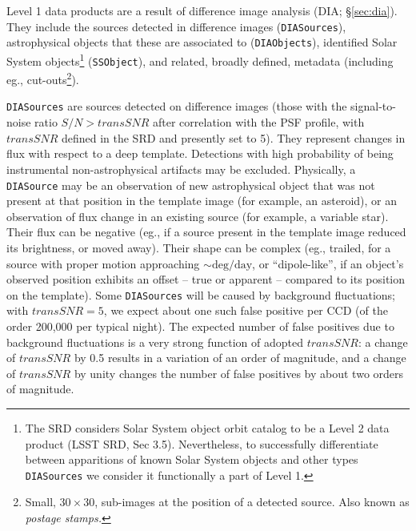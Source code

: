 \documentclass[12pt]{article}
\newcommand{\B}[1]{{\color{blue} #1}}
\newcommand{\code}[1]{\texttt{#1}}
\newcommand{\DIASource}{\code{DIASource}\xspace}
\newcommand{\DIASources}{\code{DIASources}\xspace}
\newcommand{\DIAObjects}{\code{DIAObjects}\xspace}
\newcommand{\SSObject}{\code{SSObject}\xspace}
\newcommand{\transSNR}{5\xspace}
\newcommand{\req}[1]{\marginpar{\tiny #1}}
\begin{document}
Level 1 data products are a result of difference image analysis (DIA; \S \ref{sec:dia}). They include the sources detected in difference images (\DIASources), astrophysical objects that these are associated to (\DIAObjects), identified Solar System objects\footnote{The SRD considers Solar System object orbit catalog to be a Level 2 data product (LSST SRD, Sec 3.5). Nevertheless, to successfully differentiate between apparitions of known Solar System objects and other types \DIASources we consider it functionally a part of Level 1.} (\SSObject), and related, broadly defined, metadata (including eg., cut-outs\footnote{Small, $30 \times 30$, sub-images at the position of a detected source. Also known as \emph{postage stamps.}}).

\DIASources are sources detected on difference images (those with the signal-to-noise ratio $S/N>transSNR$ after correlation with the PSF profile, with $transSNR$\req{transSNR} defined in the SRD and presently set to \transSNR). They represent changes in flux with respect to a deep template. \B{Detections with high probability of being instrumental non-astrophysical artifacts may be excluded.} Physically, a \DIASource may be an observation of new astrophysical object that was not present at that position in the template image (for example, an asteroid), or an observation of flux change in an existing source (for example, a variable star). Their flux can be negative (eg., if a source present in the template image reduced its brightness, or moved away). Their shape can be complex (eg., trailed, for a source with proper motion approaching $\sim \mathrm{deg}/\mathrm{day}$, or ``dipole-like'', if an object's observed position exhibits an offset -- true or apparent -- compared to its position on the template).
Some \DIASources will be caused by background fluctuations; with $transSNR = \transSNR$,
we expect about one such false positive per CCD (of the order 200,000 per typical night). The expected number of false
positives due to background fluctuations is a very strong function of adopted $transSNR$: a change of $transSNR$ by 0.5
results in a variation of an order of magnitude, and a change of $transSNR$ by unity changes the number of false
positives by about two orders of magnitude.
\end{document}
